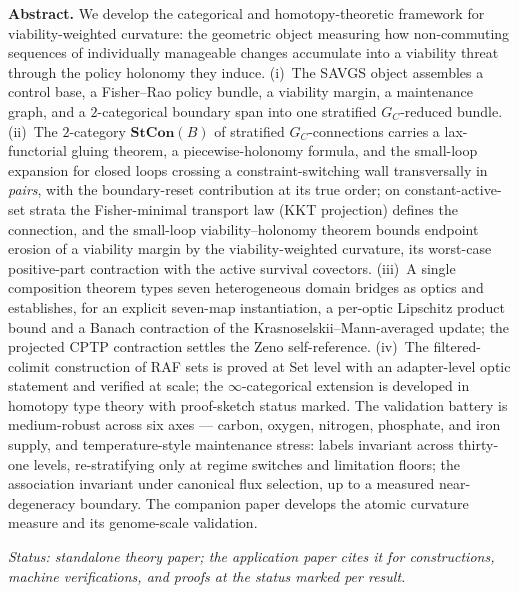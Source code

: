 \documentclass[11pt,a4paper]{article}
\theoremstyle{plain}
\theoremstyle{definition}
\theoremstyle{remark}
\begin{document}
\begin{center}
\begin{minipage}{0.92\textwidth}
\small
\textbf{Abstract.} We develop the categorical and
homotopy-theoretic framework for viability-weighted curvature: the
geometric object measuring how non-commuting sequences of
individually manageable changes accumulate into a viability threat
through the policy holonomy they induce.
(i)~The SAVGS object assembles a control base, a Fisher--Rao
policy bundle, a viability margin, a maintenance graph, and a
$2$-categorical boundary span into one stratified $G_C$-reduced
bundle. (ii)~The $2$-category $\mathbf{StCon}(B)$ of stratified
$G_C$-connections carries a lax-functorial gluing theorem, a
piecewise-holonomy formula, and the small-loop expansion for closed
loops crossing a constraint-switching wall transversally in
\emph{pairs}, with the boundary-reset contribution at its true
order; on constant-active-set strata the Fisher-minimal transport
law (KKT projection) defines the connection, and the small-loop
viability--holonomy theorem bounds endpoint erosion of a viability
margin by the viability-weighted curvature, its worst-case
positive-part contraction with the active survival covectors.
(iii)~A single composition theorem types seven heterogeneous
domain bridges as optics and establishes, for an explicit
seven-map instantiation, a per-optic Lipschitz product bound and a
Banach contraction of the Krasnoselskii--Mann-averaged update; the
projected CPTP contraction settles the Zeno self-reference.
(iv)~The filtered-colimit construction of RAF sets is proved at Set
level with an adapter-level optic statement and verified at scale;
the $\infty$-categorical extension is developed in homotopy type
theory with proof-sketch status marked. The validation battery is
medium-robust across six axes --- carbon, oxygen, nitrogen,
phosphate, and iron supply, and temperature-style maintenance
stress: labels invariant across thirty-one levels, re-stratifying
only at regime switches and limitation floors; the association
invariant under canonical flux selection, up to a measured
near-degeneracy boundary. The companion paper
develops the atomic curvature measure and its genome-scale
validation.
\par
\vspace{0.4em}
\emph{Status: standalone theory paper; the application paper
\citep{zai2026measure} cites it for constructions, machine
verifications, and proofs at the status marked per result.}
\end{minipage}
\end{center}
\end{document}
